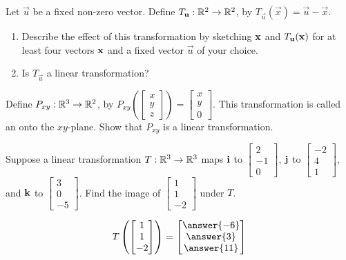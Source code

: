 \documentclass{ximera}
\begin{document}
\begin{problem}\label{prob:notlinear} 
Let $\vec{u}$ be a fixed non-zero vector.  Define $T_{\vec{u}}:\RR^2\rightarrow\RR^2$, by $T_{\vec{u}}(\vec{x})=\vec{u}-\vec{x}$.
  \begin{enumerate}
  \item 
  Describe the effect of this transformation by sketching ${\bf x}$ and $T_{\vec{u}}({\bf x})$ for at least four vectors ${\bf x}$ and a fixed vector $\vec{u}$ of your choice.
  \item 
  Is $T_{\vec{u}}$ a linear transformation?
  \end{enumerate}
\end{problem}

\begin{problem}\label{prob:projectiontrans}
Define $P_{xy}:\RR^3\rightarrow\RR^2$, by $P_{xy}\left(\begin{bmatrix}
x\\
y\\
z
\end{bmatrix} \right)=\begin{bmatrix}
x\\
y\\
0
\end{bmatrix}$.  This transformation is called an  onto the $xy$-plane.  Show that $P_{xy}$ is a linear transformation.
\end{problem}

\begin{problem}\label{prob:imagesofijk}
Suppose a linear transformation $T:\RR^3\rightarrow\RR^3$ maps ${\bf i}$ to $\begin{bmatrix}2\\-1\\0\end{bmatrix}$, ${\bf j}$ to $\begin{bmatrix}-2\\4\\1\end{bmatrix}$, and ${\bf k}$ to $\begin{bmatrix}3\\0\\-5\end{bmatrix}$.  Find the image of $\begin{bmatrix}1\\1\\-2\end{bmatrix}$ under $T$.

$$T\left(\begin{bmatrix}1\\1\\-2\end{bmatrix}\right)=\begin{bmatrix}\answer{-6}\\\answer{3}\\\answer{11}\end{bmatrix}$$
\end{problem}
\end{document}
